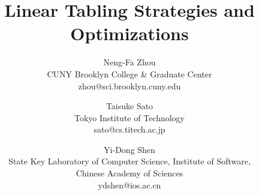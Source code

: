\documentclass{tlp}
\begin{document}
\long{}

\title{Linear Tabling Strategies and Optimizations}

\author[N.F. Zhou, T. Sato, and Y.D. Shen]
{Neng-Fa Zhou \\
CUNY Brooklyn College \& Graduate Center \\
zhou@sci.brooklyn.cuny.edu  
\and Taisuke Sato \\
Tokyo Institute of Technology \\
sato@cs.titech.ac.jp 
\and Yi-Dong Shen \\
State Key Laboratory of Computer Science, Institute of Software, \\
Chinese Academy of Sciences \\
ydshen@ios.ac.cn
}

\pagerange{\pageref{firstpage}--\pageref{lastpage}}
\setcounter{page}{1}

\maketitle

\label{firstpage}
\end{document}
